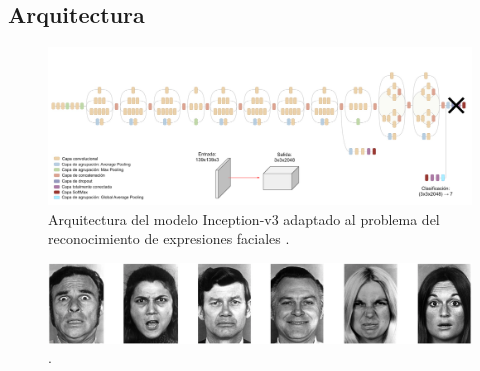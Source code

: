 \subsection{Arquitectura}

\begin{figure}
    \centering
    \includegraphics[width=\textwidth]{Images/Inception-v3.png}
    \caption{Arquitectura del modelo Inception-v3 adaptado al problema del reconocimiento de expresiones faciales \cite{img:Inception-v3}.}
    \label{fig:Inception-v3}
\end{figure}

\begin{figure}
    \centering
    \includegraphics[width=\textwidth]{Images/emotions.png}
    \caption{\cite{Inception-v3}.}
    \label{fig:InceptionModule}
\end{figure}

